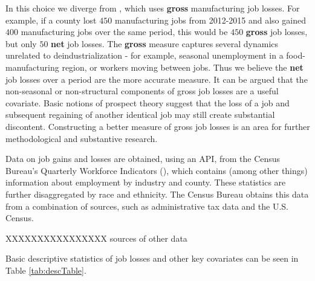 \documentclass[]{AEA}
\begin{document}
In this choice we diverge from \cite{Baccini21}, which uses
\textbf{gross} manufacturing job losses. For example, if a county lost
\(450\) manufacturing jobs from 2012-2015 and also gained \(400\)
manufacturing jobs over the same period, this would be \(450\)
\textbf{gross} job losses, but only \(50\) \textbf{net} job losses. The
\textbf{gross} measure captures several dynamics unrelated to
deindustrialization - for example, seasonal unemployment in a
food-manufacturing region, or workers moving between jobs. Thus we
believe the \textbf{net} job losses over a period are the more accurate
measure. It can be argued that the non-seasonal or non-structural
components of gross job losses are a useful covariate. Basic notions of
prospect theory suggest that the loss of a job and subsequent regaining
of another identical job may still create substantial discontent.
Constructing a better measure of gross job losses is an area for further
methodological and substantive research.

Data on job gains and losses are obtained, using an API, from the Census
Bureau's Quarterly Workforce Indicators (\cite{QWI}), which contains
(among other things) information about employment by industry and
county. These statistics are further disaggregated by race and
ethnicity. The Census Bureau obtains this data from a combination of
sources, such as administrative tax data and the U.S. Census.

XXXXXXXXXXXXXXXX sources of other data

Basic descriptive statistics of job losses and other key covariates can
be seen in Table \ref{tab:descTable}.

\begin{table}[!h]

\caption{\label{tab:descTable}Manufacturing Job Changes 2004-2015}
\centering
{}
\end{table}
\end{document}
